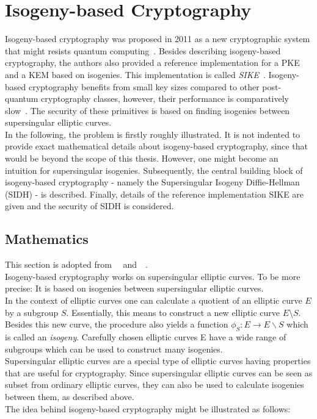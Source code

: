 \section{Isogeny-based Cryptography} \label{sec:isogeny-based_crypto}
Isogeny-based cryptography was proposed in 2011 as a new cryptographic system that might resists quantum computing~\parencite{jao2011towards}. Besides describing isogeny-based cryptography, the authors also provided a reference implementation for a \gls{PKE} and a \gls{KEM} based on isogenies. This implementation is called \textit{\gls{SIKE}}~\parencite{sike2020spec}. Isogeny-based cryptography benefits from small key sizes compared to other post-quantum cryptography classes, however, their performance is comparatively slow~\parencite{sike2020spec}. The security of these primitives is based on finding isogenies between supersingular elliptic curves.\\
In the following, the problem is firstly roughly illustrated. It is not indented to provide exact mathematical details about isogeny-based cryptography, since that would be beyond the scope of this thesis. However, one might become an intuition for supersingular isogenies. Subsequently, the central building block of isogeny-based cryptography - namely the Supersingular Isogeny Diffie-Hellman (\gls{SIDH}) - is described. Finally, details of the reference implementation \gls{SIKE} are given and the security of \gls{SIDH} is considered.

\subsection{Mathematics}
This section is adopted from~~\parencite{urbanik2017friendly} and~~\parencite{costello2019supersingular}.\\
Isogeny-based cryptography works on supersingular elliptic curves. To be more precise: It is based on isogenies between supersingular elliptic curves.
\\
In the context of elliptic curves one can calculate a quotient of an elliptic curve $E$ by a subgroup $S$. Essentially, this means to construct a new elliptic curve $E$\textbackslash $S$.
Besides this new curve, the procedure also yields a function $\phi_S: E \to E \backslash S$ which is called an \textit{isogeny}. Carefully chosen elliptic curves E have a wide range of subgroups which can be used to construct many isogenies.
\\
Supersingular elliptic curves are a special type of elliptic curves having properties that are useful for cryptography. Since supersingular elliptic curves can be seen as subset from ordinary elliptic curves, they can also be used to calculate isogenies between them, as described above.
\\
The idea behind isogeny-based cryptography might be illustrated as follows:

